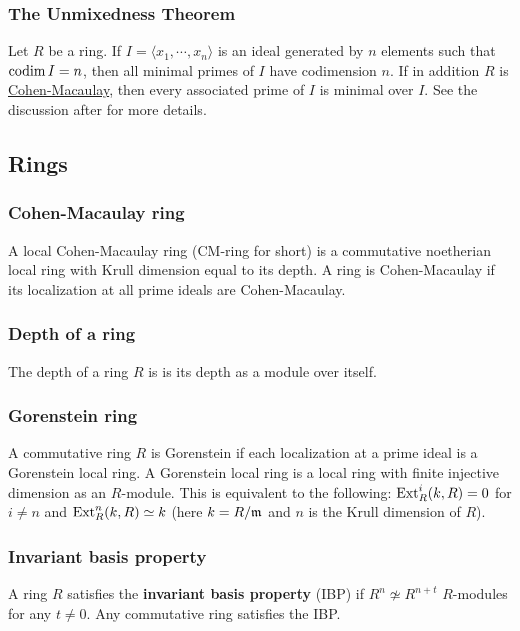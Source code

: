 \documentclass[11pt, english]{article}
\begin{document}
\subsubsection{The Unmixedness Theorem}
Let $R$ be a ring. If $I=\langle x_1,\cdots,x_n\rangle $ is an ideal generated by $n$ elements such that $\operatorname{codim} I=n$, then all minimal primes of $I$ have codimension $n$. If in addition $R$ is \hyperref[cmring]{Cohen-Macaulay}, then every associated prime of $I$ is minimal over $I$. See the discussion after \cite[Corollary 18.14]{eisenbud} for more details. 

\subsection{Rings}
\subsubsection{Cohen-Macaulay ring}
\label{cmring}
A local Cohen-Macaulay ring (CM-ring for short) is a commutative noetherian local ring with Krull dimension equal to its depth. A ring is Cohen-Macaulay if its localization at all prime ideals are Cohen-Macaulay.

\subsubsection{Depth of a ring}

The depth of a ring $R$ is is its depth as a module over itself.

\subsubsection{Gorenstein ring}

A commutative ring $R$ is Gorenstein if each localization at a prime ideal is a Gorenstein local ring. A Gorenstein local ring is a local ring with finite injective dimension as an $R$-module. This is equivalent to the following: $\operatorname{\mathrm{Ext}}_R^i(k,R)=0$ for $i \neq n$ and $\operatorname{\mathrm{Ext}}_R^n(k,R) \simeq k$ (here $k = R/\mathfrak{m}$ and $n$ is the Krull dimension of $R$).

\subsubsection{Invariant basis property}
\label{IBP}

A ring $R$ satisfies the \textbf{invariant basis property} (IBP) if $R^n \not \simeq R^{n+t}$ $R$-modules for any $t \neq 0$. Any commutative ring satisfies the IBP.
\end{document}
